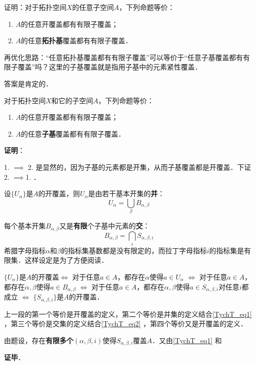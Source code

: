 \begin{exercise}{}
证明：对于拓扑空间$X$的任意子空间$A$，下列命题等价：
\begin{enumerate}
\item $A$的任意开覆盖都有有限子覆盖；
\item $A$的任意\textbf{拓扑基}覆盖都有有限子覆盖．
\end{enumerate}
\end{exercise}

再优化思路：“任意拓扑基覆盖都有有限子覆盖”可以等价于“任意子基覆盖都有有限子覆盖”吗？这里的子基覆盖就是指用子基中的元素紧性覆盖．

答案是肯定的．

\begin{theorem}{}
对于拓扑空间$X$和它的子空间$A$，下列命题等价：
\begin{enumerate}
\item $A$的任意开覆盖都有有限子覆盖；
\item $A$的任意\textbf{子基}覆盖都有有限子覆盖．
\end{enumerate}
\end{theorem}

\textbf{证明}：

1. $\implies$ 2. 是显然的，因为子基的元素都是开集，从而子基覆盖都是开覆盖．下证 2. $\implies$1. ．

设$\{U_\alpha\}$是$A$的开覆盖，则$U_\alpha$是由若干基本开集的\textbf{并}：
\begin{equation}\label{TychT_eq1}
U_\alpha = \bigcup_{\beta} B_{\alpha, \beta}
\end{equation}

每个基本开集$B_{\alpha, \beta}$又是\textbf{有限}个子基中元素的\textbf{交}：
\begin{equation}\label{TychT_eq2}
B_{\alpha, \beta} = \bigcap_{i} S_{\alpha, \beta, i}
\end{equation}
希腊字母指标$\alpha$和$\beta$的指标集基数都是没有限定的，而拉丁字母指标$i$的指标集是有限集．这样设定是为了方便阅读．

$\{U_\alpha\}$是$A$的开覆盖$\iff$ 对于任意$a\in A$，都存在$\alpha$使得$a\in U_\alpha$ $\iff$ 对于任意$a\in A$，都存在$\alpha, \beta$使得$a\in B_{\alpha, \beta}$ $\iff$ 对于任意$a\in A$，都存在$\alpha, \beta$使得$a\in S_{\alpha, \beta, i}$对任意$i$都成立 $\iff$ $\{S_{\alpha, \beta, i}\}$是$A$的开覆盖．

上一段的第一个等价是开覆盖的定义，第二个等价是并集的定义结合\autoref{TychT_eq1} ，第三个等价是交集的定义结合\autoref{TychT_eq2} ，第四个等价又是开覆盖的定义．

由题设，存在\textbf{有限多个}$(\alpha, \beta, i)$使得$S_{\alpha, \beta, i}$覆盖$A$．又由\autoref{TychT_eq1} 和

\textbf{证毕}．























